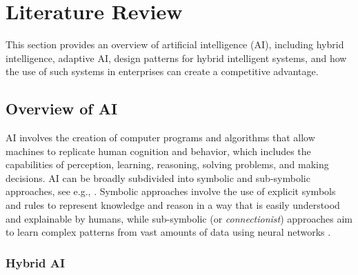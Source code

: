\section{Literature Review}
\label{sec:literature}

This section provides an overview of artificial intelligence (AI), including hybrid intelligence, adaptive AI,
design patterns for hybrid intelligent systems, and how the use of such systems in enterprises can create a
competitive advantage.

\subsection{Overview of AI}

AI involves the creation of computer programs and algorithms that allow machines to replicate human cognition and behavior,
which includes the capabilities of perception, learning, reasoning, solving problems, and making decisions. AI can be broadly
subdivided into symbolic and sub-symbolic approaches, see e.g., \cite{eliasmithSymbolicSubsymbolic2006}. Symbolic approaches
involve the use of explicit symbols and rules to represent knowledge and reason in a way that is easily understood and explainable
by humans, while sub-symbolic (or \textit{connectionist}) approaches aim to learn complex patterns from vast amounts of data
using neural networks \citep{ilkouSymbolicVsSubsymbolic2020}.

\subsubsection{Hybrid AI}


